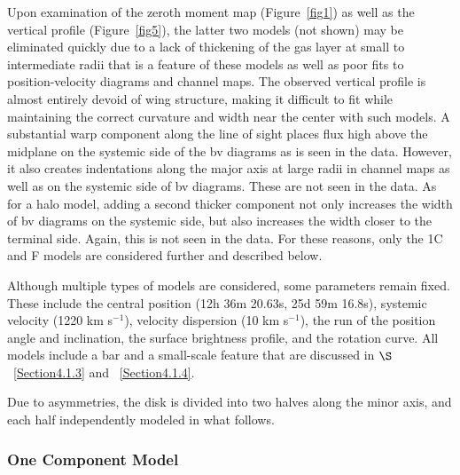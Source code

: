 \documentclass{emulateapj}
\begin{document}
\par
   Upon examination of the zeroth moment map (Figure~\ref{fig1}) as well as the vertical profile (Figure~\ref{fig5}), the latter two models (not shown) may be eliminated quickly due to a lack of thickening of the gas layer at small to intermediate radii that is a feature of these models as well as poor fits to position-velocity diagrams and channel maps. The observed vertical profile is almost entirely devoid of wing structure, making it difficult to fit while maintaining the correct curvature and width near the center with such models.  A substantial warp component along the line of sight places flux high above the midplane on the systemic side of the bv diagrams as is seen in the data.  However, it also creates indentations along the major axis at large radii in channel maps as well as on the systemic side of bv diagrams.  These are not seen in the data.  As for a halo model, adding a second thicker component not only increases the width of bv diagrams on the systemic side, but also increases the width closer to the terminal side.  Again, this is not seen in the data.  For these reasons, only the 1C and F models are considered further and described below. 

\par
    Although multiple types of models are considered, some parameters remain fixed.  These include the central position (12h 36m 20.63s, 25d 59m 16.8s), systemic velocity (1220 km s$^{-1}$), velocity dispersion (10 km s$^{-1}$), the run of the position angle and inclination, the surface brightness profile, and the rotation curve. All models include a bar and a small-scale feature that are discussed in $\S$~\ref{Section4.1.3} and ~\ref{Section4.1.4}.

\par
    Due to asymmetries, the disk is divided into two halves along the minor axis, and each half independently modeled in what follows. 

\subsubsection{One Component Model} \label{Section4.1.1}
\end{document}
